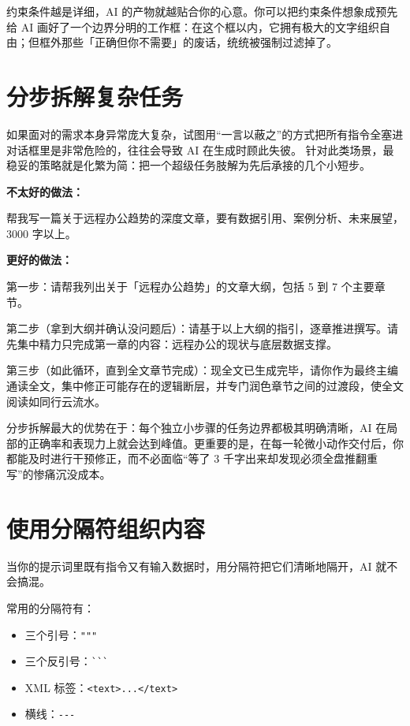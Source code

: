 约束条件越是详细，AI 的产物就越贴合你的心意。你可以把约束条件想象成预先给 AI 画好了一个边界分明的工作框：在这个框以内，它拥有极大的文字组织自由；但框外那些「正确但你不需要」的废话，统统被强制过滤掉了。

\section{分步拆解复杂任务}

如果面对的需求本身异常庞大复杂，试图用“一言以蔽之”的方式把所有指令全塞进对话框里是非常危险的，往往会导致 AI 在生成时顾此失彼。
针对此类场景，最稳妥的策略就是化繁为简：把一个超级任务肢解为先后承接的几个小短步。

\textbf{不太好的做法：}
\begin{promptbox}
帮我写一篇关于远程办公趋势的深度文章，要有数据引用、案例分析、未来展望，3000 字以上。
\end{promptbox}

\textbf{更好的做法：}

\begin{promptbox}
第一步：请帮我列出关于「远程办公趋势」的文章大纲，包括 5 到 7 个主要章节。

第二步（拿到大纲并确认没问题后）：请基于以上大纲的指引，逐章推进撰写。请先集中精力只完成第一章的内容：远程办公的现状与底层数据支撑。

第三步（如此循环，直到全文章节完成）：现全文已生成完毕，请你作为最终主编通读全文，集中修正可能存在的逻辑断层，并专门润色章节之间的过渡段，使全文阅读如同行云流水。
\end{promptbox}

分步拆解最大的优势在于：每个独立小步骤的任务边界都极其明确清晰，AI 在局部的正确率和表现力上就会达到峰值。更重要的是，在每一轮微小动作交付后，你都能及时进行干预修正，而不必面临“等了 3 千字出来却发现必须全盘推翻重写”的惨痛沉没成本。

\section{使用分隔符组织内容}

当你的提示词里既有指令又有输入数据时，用分隔符把它们清晰地隔开，AI 就不会搞混。

常用的分隔符有：

\begin{itemize}
  \item 三个引号：\verb|"""|
  \item 三个反引号：\verb|```|
  \item XML 标签：\verb|<text>...</text>|
  \item 横线：\verb|---|
\end{itemize}

